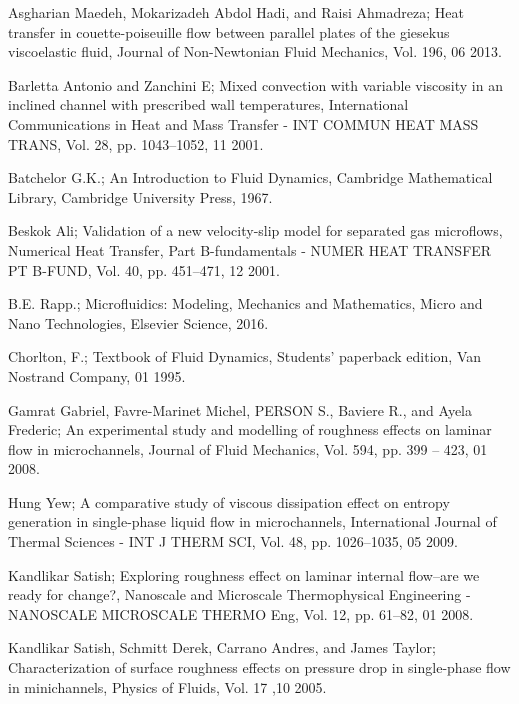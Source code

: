 \documentclass[14pt,one side, a4paper]{extbook}
\begin{document}
	 	\begin{thebibliography}{29}
	 		 Asgharian Maedeh, Mokarizadeh Abdol Hadi, and Raisi Ahmadreza; Heat transfer in couette-poiseuille flow between parallel
	 		plates of the giesekus viscoelastic fluid, Journal of Non-Newtonian
	 		Fluid Mechanics, Vol. 196, 06 2013.
	 		
	 		  Barletta Antonio and Zanchini E; Mixed convection with variable
	 		viscosity in an inclined channel with prescribed wall temperatures,
	 		International Communications in Heat and Mass Transfer - INT
	 		COMMUN HEAT MASS TRANS, Vol. 28, pp. 1043–1052, 11 2001.
	 		
	 		 Batchelor G.K.; An Introduction to Fluid Dynamics, Cambridge
	 		Mathematical Library, Cambridge University Press, 1967.
	 		
	 		 Beskok Ali; Validation of a new velocity-slip model for separated
	 		gas microflows, Numerical Heat Transfer, Part B-fundamentals -
	 		NUMER HEAT TRANSFER PT B-FUND, Vol. 40, pp. 451–471, 12 2001.
	 	
	 		B.E. Rapp.; Microfluidics: Modeling, Mechanics and Mathematics,
	 		Micro and Nano Technologies, Elsevier Science, 2016.
	 		
	 		 Chorlton, F.; Textbook of Fluid Dynamics, Students' paperback edition, Van Nostrand Company, 01 1995.
	 		
	 		  Gamrat Gabriel, Favre-Marinet Michel, PERSON S., Baviere R.,
	 		and Ayela Frederic; An experimental study and modelling of
	 		roughness effects on laminar flow in microchannels, Journal of
	 		Fluid Mechanics, Vol. 594, pp. 399 – 423, 01 2008.
	 		
	 		 Hung Yew; A comparative study of viscous dissipation effect on
	 		entropy generation in single-phase liquid flow in microchannels,
	 		International Journal of Thermal Sciences - INT J THERM SCI, Vol.
	 		48, pp. 1026–1035, 05 2009.
	 		
	 		 Kandlikar Satish; Exploring roughness effect on laminar internal flow–are we ready for change?, Nanoscale and Microscale Thermophysical Engineering - NANOSCALE MICROSCALE THERMO
	 		Eng, Vol. 12, pp. 61–82, 01 2008.
	 		
	 		 Kandlikar Satish, Schmitt Derek, Carrano Andres, and James Taylor; Characterization of surface roughness effects on pressure drop in single-phase flow in minichannels, Physics of Fluids, Vol. 17 ,10 2005.
	 		

\end{thebibliography}
\end{document}

